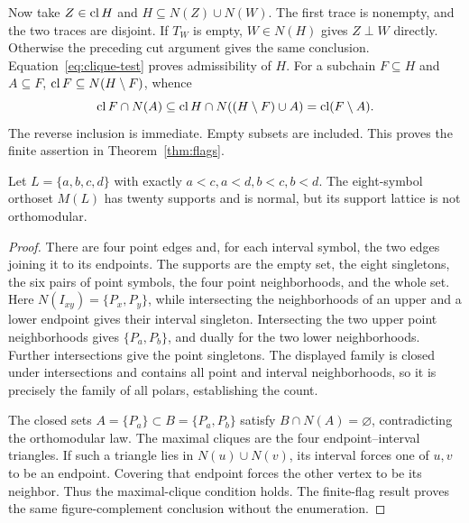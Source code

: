 Now take $Z\in\operatorname{cl} H$ and $H\subseteq N(Z)\cup N(W)$.
The first trace is nonempty, and the two traces are disjoint.
If $T_W$ is empty, $W\in N(H)$ gives $Z\perp W$ directly.
Otherwise the preceding cut argument gives the same conclusion.
Equation~\eqref{eq:clique-test} proves admissibility of $H$.
For a subchain $F\subseteq H$ and $A\subseteq F$,
$\operatorname{cl} F\subseteq N(H\setminus F)$, whence
\[
 \operatorname{cl} F\cap N(A)
 \subseteq\operatorname{cl} H\cap N((H\setminus F)\cup A)
 =\operatorname{cl}(F\setminus A).
\]
The reverse inclusion is immediate. Empty subsets are included.
This proves the finite assertion in Theorem~\ref{thm:flags}.

\begin{counterexample}
\label{ex:eight-symbols}
Let $L=\{a,b,c,d\}$ with exactly
$a<c,a<d,b<c,b<d$. The eight-symbol orthoset $M(L)$ has twenty
supports and is normal, but its support lattice is not orthomodular.
\end{counterexample}
\begin{proof}
There are four point edges and, for each interval symbol, the two
edges joining it to its endpoints. The supports are the empty set,
the eight singletons, the six pairs of point symbols, the four
point neighborhoods, and the whole set.
Here $N(I_{xy})=\{P_x,P_y\}$, while intersecting the neighborhoods
of an upper and a lower endpoint gives their interval singleton.
Intersecting the two upper point neighborhoods gives
$\{P_a,P_b\}$, and dually for the two lower neighborhoods.
Further intersections give the point singletons. The displayed
family is closed under intersections and contains all point and
interval neighborhoods, so it is precisely the family of all
polars, establishing the count.

The closed sets $A=\{P_a\}\subset B=\{P_a,P_b\}$ satisfy
$B\cap N(A)=\varnothing$, contradicting the orthomodular law.
The maximal cliques are the four endpoint--interval triangles.
If such a triangle lies in $N(u)\cup N(v)$, its interval forces
one of $u,v$ to be an endpoint. Covering that endpoint forces the
other vertex to be its neighbor. Thus the maximal-clique condition
holds. The finite-flag result proves the same figure-complement
conclusion without the enumeration.
\end{proof}

